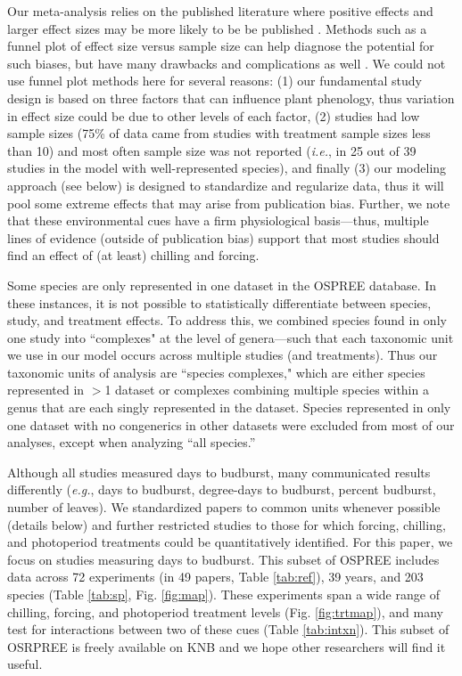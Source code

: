 \documentclass{article}
\begin{document}
\par Our meta-analysis relies on the published literature where positive effects and larger effect sizes may be more likely to be be published \emph{\citep{Kicinski2013}}. Methods such as a funnel plot of effect size versus sample size can help diagnose the potential for such biases, but have many drawbacks and complications as well \emph{\citep{Gurevitch1992,Gurevitch1999,Lin2018}}. We could not use funnel plot methods here for several reasons: (1) our fundamental study design is based on three factors that can influence plant phenology, thus variation in effect size could be due to other levels of each factor, (2) studies had low sample sizes (75\% of data came from studies with treatment sample sizes less than 10) and most often sample size was not reported (\emph{i.e.}, in 25 out of 39 studies in the model with well-represented species), and finally (3) our modeling approach (see below) is designed to standardize and regularize data, thus it will pool some extreme effects that may arise from publication bias. Further, we note that these environmental cues have a firm physiological basis---thus, multiple lines of evidence (outside of publication bias) support that most studies should find an effect of (at least) chilling and forcing. 

\par Some species are only represented in one dataset in the OSPREE database. In these instances, it is not possible to statistically differentiate between species, study, and treatment effects. To address this, we combined species found in only one study into ``complexes" at the level of genera---such that each taxonomic unit we use in our model occurs across multiple studies (and treatments). Thus our taxonomic units of analysis are ``species complexes," which are either species represented in $>$1 dataset or complexes combining multiple species within a genus that are each singly represented in the dataset. Species represented in only one dataset with no congenerics in other datasets were excluded from most of our analyses, except when analyzing ``all species.''

\par Although all studies measured days to budburst, many communicated results differently (\emph{e.g.}, days to budburst, degree-days to budburst, percent budburst, number of leaves). We standardized papers to common units whenever possible (details below) and further restricted studies to those for which forcing, chilling, and photoperiod treatments could be quantitatively identified. For this paper, we focus on studies measuring days to budburst. This subset of OSPREE includes data across 72 experiments (in 49 papers, Table \ref{tab:ref}), 39 years, and 203 species (Table \ref{tab:sp}, Fig. \ref{fig:map}). These experiments span a wide range of chilling, forcing, and photoperiod treatment levels (Fig. \ref{fig:trtmap}), and many test for interactions between two of these cues (Table \ref{tab:intxn}). This subset of OSRPREE is freely available on KNB \emph{\citep{wolkovich2019}} and we hope other researchers will find it useful. 
\end{document}
